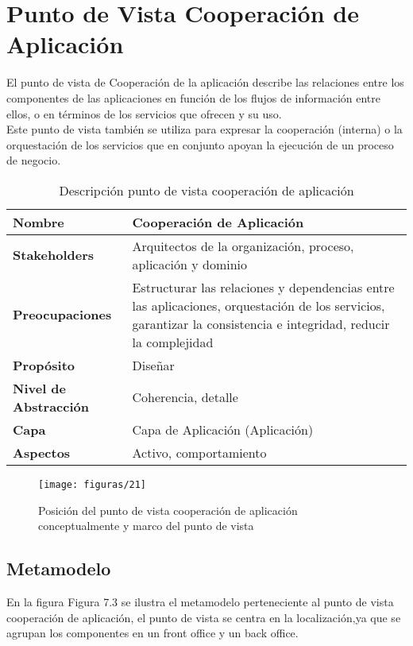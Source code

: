 \section{Punto de Vista Cooperación de Aplicación}
El punto de vista de Cooperación de la aplicación describe las relaciones entre los componentes de las aplicaciones en función de los flujos de información entre ellos, o en términos de los servicios que ofrecen y su uso. \\

Este punto de vista también se utiliza para expresar la cooperación (interna) o la orquestación de los servicios que en conjunto apoyan la ejecución de un proceso de negocio.

  \begin{table}[H]
  	\centering
  	\begin{tabular}{p{3.7cm}p{8cm}}
  		\hline
  		\rowcolor[HTML]{0073a1}
  		{\color[HTML]{FFFFFF} \textbf{Nombre}} & {\color[HTML]{FFFFFF} \textbf{Cooperación de Aplicación}} \\
  		\hline
  		\textbf{Stakeholders} & Arquitectos de la organización, proceso, aplicación y dominio \\
  		\textbf{Preocupaciones} & Estructurar las relaciones y dependencias entre las aplicaciones, orquestación de los servicios, garantizar la consistencia e integridad, reducir la complejidad \\
  		\textbf{Propósito} & Diseñar \\
  		\textbf{Nivel de Abstracción} & Coherencia, detalle \\
  		\textbf{Capa} & Capa de Aplicación (Aplicación) \\
  		\textbf{Aspectos} & Activo, comportamiento \\
  		\bottomrule
  	\end{tabular}
  	\captionsetup{width=.95\textwidth}
  	\caption{Descripción punto de vista cooperación de aplicación}
  	\label{tabla11}
  \end{table}

\begin{figure}[H]
	\centering
	\texttt{[image: figuras/21]}
	\captionsetup{width=.95\textwidth}
	\caption{Posición del punto de vista cooperación de aplicación conceptualmente y marco del punto de vista}
	\label{figura21}
\end{figure}

\subsection{Metamodelo}
En la figura Figura 7.3 se ilustra el metamodelo perteneciente al punto de vista cooperación de aplicación, el punto de vista se centra en la localización,ya que se agrupan los componentes en un front office y un back office.

